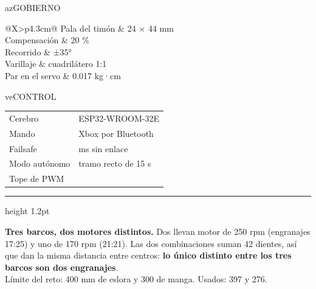 \documentclass[landscape]{extarticle}
\makeatletter
\newcommand{\filas}[1]{\large\begin{tabularx}{\linewidth}{@{}X>{\raggedleft\arraybackslash}p{4.3cm}@{}}#1\end{tabularx}}
\makeatother
\begin{document}
\begin{minipage}[t]{0.665\textwidth}
  \vspace{7mm}

  \begin{minipage}[t]{0.485\linewidth}\begin{tarjeta}{az}{GOBIERNO}
    \filas{
      Pala del timón & 24 × 44 mm \\
      Compensación & 20 \% \\
      Recorrido & ±35° \\
      Varillaje & cuadrilátero 1:1 \\
      Par en el servo & 0.017 kg·cm \\}
  \end{tarjeta}\end{minipage}\hfill
  \begin{minipage}[t]{0.485\linewidth}\begin{tarjeta}{ve}{CONTROL}
    \filas{
      Cerebro & ESP32-WROOM-32E \\
      Mando & Xbox por Bluetooth \\
      Failsafe & 500 ms sin enlace \\
      Modo autónomo & tramo recto de 15 s \\
      Tope de PWM & 0.60 \\}
  \end{tarjeta}\end{minipage}

  \vspace{9mm}
  {\color{gris}\hrule height 1.2pt}\vspace{3mm}
  {\normalsize \textbf{Tres barcos, dos motores distintos.} Dos llevan motor de 250 rpm
  (engranajes 17:25) y uno de 170 rpm (21:21). Las dos combinaciones suman 42 dientes, así
  que dan la misma distancia entre centros: \textbf{lo único distinto entre los tres barcos
  son dos engranajes}.\\[2mm]
  {\color{gris} Límite del reto: 400 mm de eslora y 300 de manga. Usados: 397 y 276.}}
\end{minipage}
\end{document}
